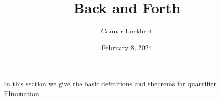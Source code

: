 \documentclass[a4paper]{article}
\title{Back and Forth}
\date{February 8, 2024}
\author{Connor Lockhart}
\begin{document}
\maketitle
\par{In this section we give the basic definitions and theorems for quantifier Elimination}
\printbibliography
\end{document}
